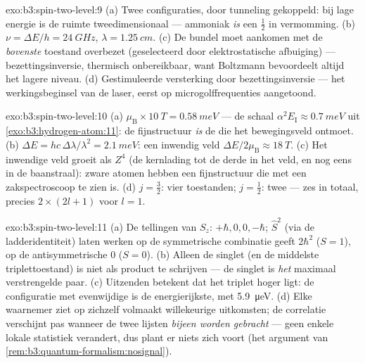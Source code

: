 \begin{solution}{exo:b3:spin-two-level:9}
(a) Twee configuraties, door tunneling gekoppeld: bij lage energie is de
ruimte tweedimensionaal --- ammoniak \emph{is} een  $\tfrac12$ in
vermomming. (b) $\nu = \Delta E/h = \qty{24}{GHz}$, $\lambda =
\qty{1.25}{cm}$. (c) De bundel moet aankomen met de \emph{bovenste}
toestand overbezet (geselecteerd door elektrostatische afbuiging) ---
bezettingsinversie, thermisch onbereikbaar, want Boltzmann bevoordeelt
altijd het lagere niveau. (d) Gestimuleerde versterking door
bezettingsinversie --- het werkingsbeginsel van de laser, eerst op
microgolffrequenties aangetoond.
\end{solution}

\begin{solution}{exo:b3:spin-two-level:10}
(a) $\mu_{\text{B}} \times \qty{10}{T} = \qty{0.58}{meV}$ --- de schaal
$\alpha^2E_{\text{I}} \approx \qty{0.7}{meV}$ uit
\cref{exo:b3:hydrogen-atom:11}: de fijnstructuur \emph{is} de  die
het bewegingsveld ontmoet. (b) $\Delta E = hc\,\Delta\lambda/
\lambda^2 = \qty{2.1}{meV}$: een inwendig veld $\Delta E/2\mu_{
\text{B}} \approx \qty{18}{T}$. (c) Het inwendige veld groeit als
$Z^4$ (de kernlading tot de derde in het veld, en nog eens in de
baanstraal): zware atomen hebben een fijnstructuur die met een
zakspectroscoop te zien is. (d) $j = \tfrac32$: vier toestanden; $j = \tfrac12$: twee --- zes in totaal, precies $2 \times (2l + 1)$ voor $l = 1$.
\end{solution}

\begin{solution}{exo:b3:spin-two-level:11}
(a) De tellingen van $S_z$: $+\hbar, 0, 0, -\hbar$; $\hat S^2$ (via de
ladderidentiteit) laten werken op de symmetrische combinatie geeft
$2\hbar^2$ ($S = 1$), op de antisymmetrische $0$ ($S = 0$). (b)
Alleen de singlet (en de middelste triplettoestand) is niet als product
te schrijven --- de singlet is \emph{het} maximaal verstrengelde paar.
(c) Uitzenden betekent dat het triplet hoger ligt: de configuratie met
evenwijdige  is de energierijkste, met \qty{5.9}{\micro eV}. (d)
Elke waarnemer ziet op zichzelf volmaakt willekeurige uitkomsten; de
correlatie verschijnt pas wanneer de twee lijsten \emph{bijeen worden
gebracht} --- geen enkele lokale statistiek verandert, dus plant er niets
zich voort (het argument van \cref{rem:b3:quantum-formalism:nosignal}).
\end{solution}

